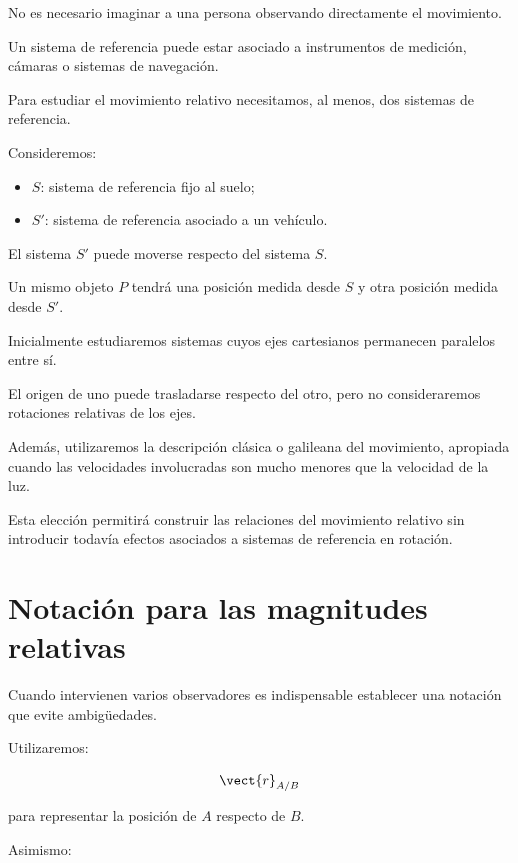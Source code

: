 No es necesario imaginar a una persona observando directamente
el movimiento.

Un sistema de referencia puede estar asociado a instrumentos
de medición, cámaras o sistemas de navegación.

Para estudiar el movimiento relativo necesitamos, al menos,
dos sistemas de referencia.

Consideremos:

\begin{itemize}
    \item \(S\): sistema de referencia fijo al suelo;
    \item \(S'\): sistema de referencia asociado a un vehículo.
\end{itemize}

El sistema \(S'\) puede moverse respecto del sistema \(S\).

Un mismo objeto \(P\) tendrá una posición medida desde \(S\)
y otra posición medida desde \(S'\).

\begin{modelo}

Inicialmente estudiaremos sistemas cuyos ejes cartesianos
permanecen paralelos entre sí.

El origen de uno puede trasladarse respecto del otro, pero
no consideraremos rotaciones relativas de los ejes.

Además, utilizaremos la descripción clásica o galileana
del movimiento, apropiada cuando las velocidades involucradas
son mucho menores que la velocidad de la luz.

\end{modelo}

Esta elección permitirá construir las relaciones del movimiento
relativo sin introducir todavía efectos asociados a sistemas
de referencia en rotación.


\section{Notación para las magnitudes relativas}

Cuando intervienen varios observadores es indispensable
establecer una notación que evite ambigüedades.

Utilizaremos:

\[
\vect{r}_{A/B}
\]

para representar la posición de \(A\) respecto de \(B\).

Asimismo:

